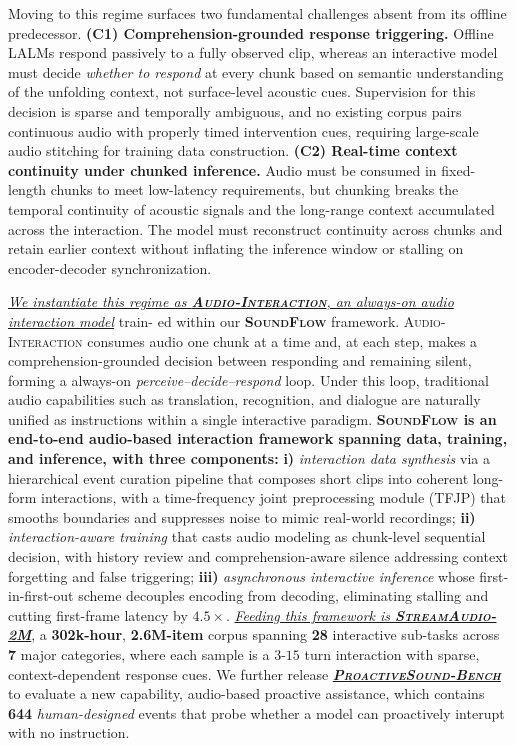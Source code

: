 \documentclass{llmxive}
\begin{document}
\vspace{1mm}
Moving to this regime surfaces two fundamental challenges absent from its offline predecessor.
%
\textbf{(C1) Comprehension-grounded response triggering.}
Offline LALMs respond passively to a fully observed clip, whereas an interactive model must decide \emph{whether to respond} at every chunk based on semantic understanding of the unfolding context, not surface-level acoustic cues. Supervision for this decision is sparse and temporally ambiguous, and no existing corpus pairs continuous audio with properly timed intervention cues, requiring large-scale audio stitching for training data construction.
%
\textbf{(C2) Real-time context continuity under chunked inference.}
Audio must be consumed in fixed-length chunks to meet low-latency requirements, but chunking breaks the temporal continuity of acoustic signals and the long-range context accumulated across the interaction. The model must reconstruct continuity across chunks and retain earlier context without inflating the inference window or stalling on encoder-decoder synchronization. 


\vspace{1mm}
\underline{\textit{We instantiate this regime as \textbf{\textsc{Audio-Interaction}}, an always-on audio interaction model}} train- ed within our \textbf{\textsc{SoundFlow}} framework. \textsc{Audio-Interaction} consumes audio one chunk at a time and, at each step, makes a comprehension-grounded decision between responding and remaining silent, forming a always-on \emph{perceive--decide--respond} loop. Under this loop, traditional audio capabilities such as translation, recognition, and dialogue are naturally unified as instructions within a single interactive paradigm. \textbf{\textsc{SoundFlow} is an end-to-end audio-based interaction framework spanning data, training, and inference, with three components:} \textbf{i)} \emph{interaction data synthesis} via a hierarchical event curation pipeline that composes short clips into coherent long-form interactions, with a time-frequency joint preprocessing module (\textsc{TFJP}) that smooths boundaries and suppresses noise to mimic real-world recordings; \textbf{ii)} \emph{interaction-aware training} that casts audio modeling as chunk-level sequential decision, with history review and comprehension-aware silence addressing context forgetting and false triggering; \textbf{iii)} \emph{asynchronous interactive inference} whose first-in-first-out scheme decouples encoding from decoding, eliminating stalling and cutting first-frame latency by $4.5\times$. \underline{\textit{Feeding this framework is \textbf{\textsc{StreamAudio-2M}}}}, a \textbf{302k-hour}, \textbf{2.6M-item} corpus spanning \textbf{28} interactive sub-tasks across \textbf{7} major categories, where each sample is a $3$-$15$ turn interaction with sparse, context-dependent response cues. We further release \underline{\textit{\textbf{\textsc{ProactiveSound-Bench}}}} to evaluate a new capability, audio-based proactive assistance, which contains \textbf{644} \textit{human-designed} events that probe whether a model can proactively interupt with no instruction. 
\end{document}
